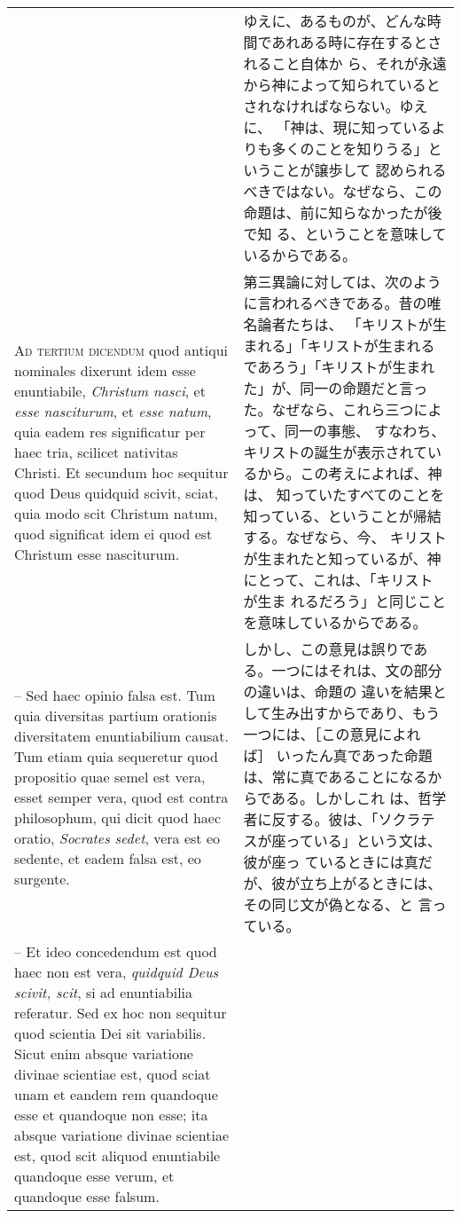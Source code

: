 \documentclass[10pt]{jsarticle} %
\begin{document}
\begin{longtable}{p{21em}p{21em}}
&

ゆえに、あるものが、どんな時間であれある時に存在するとされること自体か
ら、それが永遠から神によって知られているとされなければならない。ゆえに、
「神は、現に知っているよりも多くのことを知りうる」ということが譲歩して
認められるべきではない。なぜなら、この命題は、前に知らなかったが後で知
る、ということを意味しているからである。

\\


{\scshape Ad tertium dicendum} quod antiqui nominales dixerunt idem esse
enuntiabile, {\itshape Christum nasci}, et {\itshape esse nasciturum},
et {\itshape esse natum}, quia eadem res significatur per haec tria,
scilicet nativitas Christi. Et secundum hoc sequitur quod Deus quidquid
scivit, sciat, quia modo scit Christum natum, quod significat idem ei
quod est Christum esse nasciturum. 


&

第三異論に対しては、次のように言われるべきである。昔の唯名論者たちは、
「キリストが生まれる」「キリストが生まれるであろう」「キリストが生まれ
た」が、同一の命題だと言った。なぜなら、これら三つによって、同一の事態、
すなわち、キリストの誕生が表示されているから。この考えによれば、神は、
知っていたすべてのことを知っている、ということが帰結する。なぜなら、今、
キリストが生まれたと知っているが、神にとって、これは、「キリストが生ま
れるだろう」と同じことを意味しているからである。

\\


-- Sed haec opinio falsa est. Tum
quia diversitas partium orationis diversitatem enuntiabilium causat. Tum
etiam quia sequeretur quod propositio quae semel est vera, esset semper
vera, quod est contra philosophum, qui dicit quod haec oratio, {\itshape
Socrates sedet}, vera est eo sedente, et eadem falsa est, eo
surgente. 


&

しかし、この意見は誤りである。一つにはそれは、文の部分の違いは、命題の
違いを結果として生み出すからであり、もう一つには、［この意見によれば］
いったん真であった命題は、常に真であることになるからである。しかしこれ
は、哲学者に反する。彼は、「ソクラテスが座っている」という文は、彼が座っ
ているときには真だが、彼が立ち上がるときには、その同じ文が偽となる、と
言っている。

\\


-- Et ideo concedendum est quod haec non est vera, {\itshape
quidquid Deus scivit, scit}, si ad enuntiabilia referatur. Sed ex hoc
non sequitur quod scientia Dei sit variabilis. Sicut enim absque
variatione divinae scientiae est, quod sciat unam et eandem rem
quandoque esse et quandoque non esse; ita absque variatione divinae
scientiae est, quod scit aliquod enuntiabile quandoque esse verum, et
quandoque esse falsum. 



\end{longtable}
\end{document}
